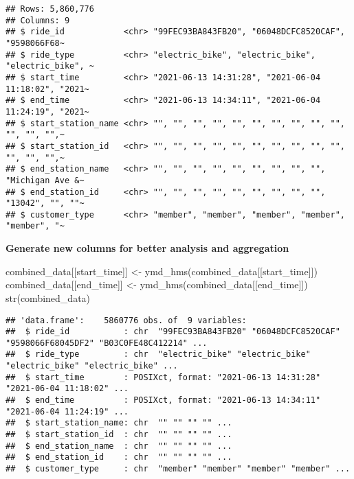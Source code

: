 \documentclass[
]{article}
\newenvironment{Shaded}{\begin{snugshade}}{\end{snugshade}}
\newcommand{\FunctionTok}[1]{\textcolor[rgb]{0.00,0.00,0.00}{#1}}
\newcommand{\NormalTok}[1]{#1}
\newcommand{\OtherTok}[1]{\textcolor[rgb]{0.56,0.35,0.01}{#1}}
\newcommand{\StringTok}[1]{\textcolor[rgb]{0.31,0.60,0.02}{#1}}
\begin{document}
\begin{verbatim}
## Rows: 5,860,776
## Columns: 9
## $ ride_id            <chr> "99FEC93BA843FB20", "06048DCFC8520CAF", "9598066F68~
## $ ride_type          <chr> "electric_bike", "electric_bike", "electric_bike", ~
## $ start_time         <chr> "2021-06-13 14:31:28", "2021-06-04 11:18:02", "2021~
## $ end_time           <chr> "2021-06-13 14:34:11", "2021-06-04 11:24:19", "2021~
## $ start_station_name <chr> "", "", "", "", "", "", "", "", "", "", "", "", "",~
## $ start_station_id   <chr> "", "", "", "", "", "", "", "", "", "", "", "", "",~
## $ end_station_name   <chr> "", "", "", "", "", "", "", "", "", "Michigan Ave &~
## $ end_station_id     <chr> "", "", "", "", "", "", "", "", "", "13042", "", ""~
## $ customer_type      <chr> "member", "member", "member", "member", "member", "~
\end{verbatim}

\textbf{Generate new columns for better analysis and aggregation}

\begin{Shaded}
\begin{Highlighting}[]
\NormalTok{combined\_data[[}\StringTok{\textquotesingle{}start\_time\textquotesingle{}}\NormalTok{]] }\OtherTok{\textless{}{-}} \FunctionTok{ymd\_hms}\NormalTok{(combined\_data[[}\StringTok{\textquotesingle{}start\_time\textquotesingle{}}\NormalTok{]])}
\NormalTok{combined\_data[[}\StringTok{\textquotesingle{}end\_time\textquotesingle{}}\NormalTok{]] }\OtherTok{\textless{}{-}} \FunctionTok{ymd\_hms}\NormalTok{(combined\_data[[}\StringTok{\textquotesingle{}end\_time\textquotesingle{}}\NormalTok{]])}
\FunctionTok{str}\NormalTok{(combined\_data)}
\end{Highlighting}
\end{Shaded}

\begin{verbatim}
## 'data.frame':    5860776 obs. of  9 variables:
##  $ ride_id           : chr  "99FEC93BA843FB20" "06048DCFC8520CAF" "9598066F68045DF2" "B03C0FE48C412214" ...
##  $ ride_type         : chr  "electric_bike" "electric_bike" "electric_bike" "electric_bike" ...
##  $ start_time        : POSIXct, format: "2021-06-13 14:31:28" "2021-06-04 11:18:02" ...
##  $ end_time          : POSIXct, format: "2021-06-13 14:34:11" "2021-06-04 11:24:19" ...
##  $ start_station_name: chr  "" "" "" "" ...
##  $ start_station_id  : chr  "" "" "" "" ...
##  $ end_station_name  : chr  "" "" "" "" ...
##  $ end_station_id    : chr  "" "" "" "" ...
##  $ customer_type     : chr  "member" "member" "member" "member" ...
\end{verbatim}
\end{document}
